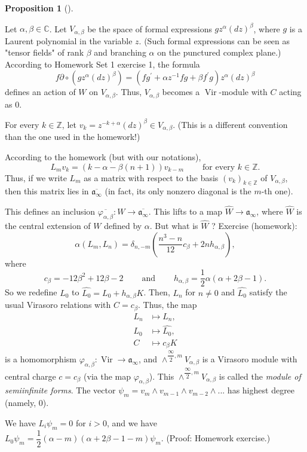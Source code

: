 \documentclass
[numbers=enddot,12pt,final,onecolumn,german,notitlepage]{scrartcl}%
\theoremstyle{definition}
\newtheorem{prop}[theo]{Proposition}
\newenvironment{proposition}[1][]
{\begin{prop}[#1]\begin{leftbar}}
{\end{leftbar}\end{prop}}
\begin{document}
\begin{proposition}
Let $\alpha,\beta\in\mathbb{C}$. Let $V_{\alpha,\beta}$ be the space of formal
expressions $gz^{\alpha}\left(  dz\right)  ^{\beta}$, where $g$ is a Laurent
polynomial in the variable $z$. (Such formal expressions can be seen as
"tensor fields" of rank $\beta$ and branching $\alpha$ on the punctured
complex plane.) According to Homework Set 1 exercise 1, the formula
\begin{equation}
f\partial\circ\left(  gz^{\alpha}\left(  dz\right)  ^{\beta}\right)  =\left(
fg^{\prime}+\alpha z^{-1}fg+\beta f^{\prime}g\right)  z^{\alpha}\left(
dz\right)  ^{\beta} \label{ex1.1.1}%
\end{equation}
defines an action of $W$ on $V_{\alpha,\beta}$. Thus, $V_{\alpha,\beta}$
becomes a $\operatorname*{Vir}$-module with $C$ acting as $0$.

For every $k\in\mathbb{Z}$, let $v_{k}=z^{-k+\alpha}\left(  dz\right)
^{\beta}\in V_{\alpha,\beta}$. (This is a different convention than the one
used in the homework!)

According to the homework (but with our notations),%
\[
L_{m}v_{k}=\left(  k-\alpha-\beta\left(  n+1\right)  \right)  v_{k-m}%
\ \ \ \ \ \ \ \ \ \ \text{for every }k\in\mathbb{Z}.
\]
Thus, if we write $L_{m}$ as a matrix with respect to the basis $\left(
v_{k}\right)  _{k\in\mathbb{Z}}$ of $V_{\alpha,\beta}$, then this matrix lies
in $\overline{\mathfrak{a}_{\infty}}$ (in fact, its only nonzero diagonal is
the $m$-th one).

This defines an inclusion $\overline{\varphi_{\alpha,\beta}}:W\rightarrow
\overline{\mathfrak{a}_{\infty}}$. This lifts to a map $\widehat{W}%
\rightarrow\mathfrak{a}_{\infty}$, where $\widehat{W}$ is the central
extension of $W$ defined by $\alpha$. But what is $\widehat{W}$ ? Exercise
(homework):%
\[
\alpha\left(  L_{m},L_{n}\right)  =\delta_{n,-m}\left(  \dfrac{n^{3}-n}%
{12}c_{\beta}+2nh_{\alpha,\beta}\right)  ,
\]
where
\[
c_{\beta}=-12\beta^{2}+12\beta-2\ \ \ \ \ \ \ \ \ \ \text{and}%
\ \ \ \ \ \ \ \ \ \ h_{\alpha,\beta}=\dfrac{1}{2}\alpha\left(  \alpha
+2\beta-1\right)  .
\]
So we redefine $L_{0}$ to $\widehat{L_{0}}=L_{0}+h_{\alpha,\beta}K$. Then,
$L_{n}$ for $n\neq0$ and $\widehat{L_{0}}$ satisfy the usual Virasoro
relations with $C=c_{\beta}$. Thus, the map%
\begin{align*}
L_{n}  &  \mapsto L_{n},\\
L_{0}  &  \mapsto\widehat{L_{0}},\\
C  &  \mapsto c_{\beta}K
\end{align*}
is a homomorphism $\varphi_{\alpha,\beta}:\operatorname*{Vir}\rightarrow
\mathfrak{a}_{\infty}$, and $\wedge^{\dfrac{\infty}{2},m}V_{\alpha,\beta}$ is
a Virasoro module with central charge $c=c_{\beta}$ (via the map
$\varphi_{\alpha,\beta}$). This $\wedge^{\dfrac{\infty}{2},m}V_{\alpha,\beta}$
is called the \textit{module of semiinfinite forms}. The vector $\psi
_{m}=v_{m}\wedge v_{m-1}\wedge v_{m-2}\wedge...$ has highest degree (namely,
$0$).

We have $L_{i}\psi_{m}=0$ for $i>0$, and we have $L_{0}\psi_{m}=\dfrac{1}%
{2}\left(  \alpha-m\right)  \left(  \alpha+2\beta-1-m\right)  \psi_{m}$.
(Proof: Homework exercise.)
\end{proposition}
\end{document}

